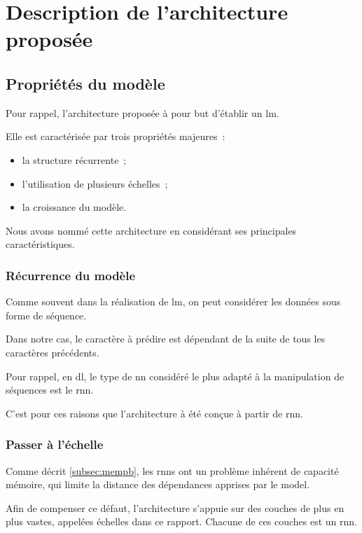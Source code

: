 {\chapter{Description de l'architecture proposée}\label{ch:gmsnn_model}
\section{Propriétés du modèle}
Pour rappel, l'architecture proposée à pour but d'établir un \gls{lm}.

Elle est caractérisée par trois propriétés majeures~:
\begin{itemize}
	\item la structure récurrente~;
	\item l'utilisation de plusieurs échelles~;
	\item la croissance du modèle.
\end{itemize}

Nous avons nommé cette architecture  en considérant ses principales caractéristiques.

\subsection{Récurrence du modèle}
Comme souvent dans la réalisation de \gls{lm}, on peut considérer les données sous forme de séquence.

Dans notre cas, le caractère à prédire est dépendant de la suite de tous les caractères précédents.

Pour rappel, en \gls{dl}, le type de \gls{nn} considéré le plus adapté à la manipulation de séquences est le \gls{rnn}.

C'est pour ces raisons que l'architecture à été conçue à partir de \gls{rnn}.

\subsection{Passer à l'échelle}\label{subsec:scaling}
Comme décrit \autoref{subsec:mempb}, les \glspl{rnn} ont un problème inhérent de capacité mémoire, qui limite la distance des dépendances apprises par le \gls{model}.

Afin de compenser ce défaut, l'architecture  s'appuie sur des couches de plus en plus vastes, appelées \og échelles\fg{} dans ce rapport.
Chacune de ces couches est un \gls{rnn}.

}
